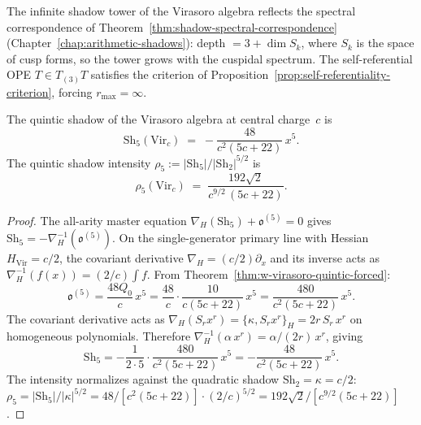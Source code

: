 \begin{remark}
\label{rem:virasoro-spectral-curve}
The infinite shadow tower of the Virasoro algebra reflects the spectral
correspondence of Theorem~\ref{thm:shadow-spectral-correspondence}
(Chapter~\ref{chap:arithmetic-shadows}): depth $= 3 + \dim S_k$, where
$S_k$ is the space of cusp forms, so the tower grows with
the cuspidal spectrum.  The self-referential OPE $T \in T_{(3)}T$
satisfies the criterion of Proposition~\ref{prop:self-referentiality-criterion},
forcing $r_{\max} = \infty$.
\end{remark}

\begin{corollary}
\label{cor:virasoro-quintic-shadow-explicit}
The quintic shadow of the Virasoro algebra at central charge~$c$ is
\begin{equation}
\label{eq:virasoro-sh5-formula}
\mathrm{Sh}_5(\mathrm{Vir}_c)
\;=\;
-\frac{48}{c^2(5c+22)}\,x^5.
\end{equation}
The quintic shadow intensity $\rho_5 :=
|\mathrm{Sh}_5|/|\mathrm{Sh}_2|^{5/2}$ is
\begin{equation}
\label{eq:virasoro-quintic-intensity}
\rho_5(\mathrm{Vir}_c)
\;=\;
\frac{192\sqrt{2}}{c^{9/2}\,(5c+22)}.
\end{equation}
\end{corollary}

\begin{proof}
The all-arity master equation
$\nabla_H(\mathrm{Sh}_5) + \mathfrak{o}^{(5)} = 0$
gives $\mathrm{Sh}_5 = -\nabla_H^{-1}(\mathfrak{o}^{(5)})$.
On the single-generator primary line with Hessian
$H_{\mathrm{Vir}} = c/2$, the covariant derivative
$\nabla_H = (c/2)\partial_x$ and its inverse acts as
$\nabla_H^{-1}(f(x)) = (2/c)\int f$.  From
Theorem~\ref{thm:w-virasoro-quintic-forced}:
\[
\mathfrak{o}^{(5)}
= \frac{48 Q_0}{c}\,x^5
= \frac{48}{c}\cdot\frac{10}{c(5c+22)}\,x^5
= \frac{480}{c^2(5c+22)}\,x^5.
\]
The covariant derivative acts as $\nabla_H(S_r x^r) =
\{\kappa, S_r x^r\}_{H} = 2r\,S_r\, x^r$ on homogeneous
polynomials.  Therefore $\nabla_H^{-1}(\alpha\, x^r) =
\alpha/(2r)\,x^r$, giving
\[
\mathrm{Sh}_5
= -\frac{1}{2 \cdot 5}\cdot
\frac{480}{c^2(5c+22)}\,x^5
= -\frac{48}{c^2(5c+22)}\,x^5.
\]
The intensity normalizes against the quadratic shadow
$\mathrm{Sh}_2 = \kappa = c/2$:
$\rho_5 = |\mathrm{Sh}_5|/|\kappa|^{5/2}
= 48/[c^2(5c+22)] \cdot (2/c)^{5/2}
= 192\sqrt{2}/[c^{9/2}(5c+22)]$.
\end{proof}


